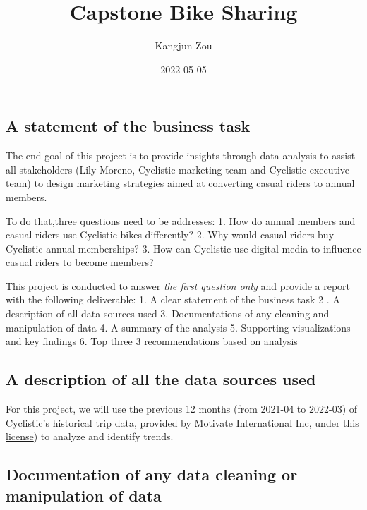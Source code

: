 \documentclass[
]{article}
\title{Capstone Bike Sharing}
\author{Kangjun Zou}
\date{2022-05-05}
\begin{document}
\maketitle

\hypertarget{a-statement-of-the-business-task}{%
\subsection{A statement of the business
task}\label{a-statement-of-the-business-task}}

The end goal of this project is to provide insights through data
analysis to assist all stakeholders (Lily Moreno, Cyclistic marketing
team and Cyclistic executive team) to design marketing strategies aimed
at converting casual riders to annual members.

To do that,three questions need to be addresses: 1. How do annual
members and casual riders use Cyclistic bikes differently? 2. Why would
casual riders buy Cyclistic annual memberships? 3. How can Cyclistic use
digital media to influence casual riders to become members?

This project is conducted to answer \emph{the first question only} and
provide a report with the following deliverable: 1. A clear statement of
the business task 2 . A description of all data sources used 3.
Documentations of any cleaning and manipulation of data 4. A summary of
the analysis 5. Supporting visualizations and key findings 6. Top three
3 recommendations based on analysis

\hypertarget{a-description-of-all-the-data-sources-used}{%
\subsection{A description of all the data sources
used}\label{a-description-of-all-the-data-sources-used}}

For this project, we will use the previous 12 months (from 2021-04 to
2022-03) of Cyclistic's historical trip data, provided by Motivate
International Inc, under this \href{www.divvybikes.com}{license}) to
analyze and identify trends.

\hypertarget{documentation-of-any-data-cleaning-or-manipulation-of-data}{%
\subsection{Documentation of any data cleaning or manipulation of
data}\label{documentation-of-any-data-cleaning-or-manipulation-of-data}}
\end{document}
